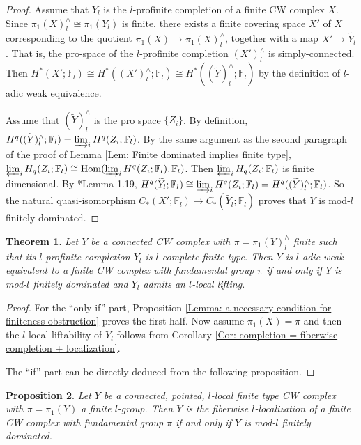 \documentclass[11pt]{amsart}
\newtheorem{theorem}{Theorem}[section]
\newtheorem{proposition}[theorem]{Proposition}
\theoremstyle{definition}
\numberwithin{equation}{section}
\numberwithin{equation}{section}
\newcommand\FF{\mathbb{F}}
\DeclareMathOperator{\homo}{Hom}
\begin{document}
\begin{proof}
Assume that $Y_l$ is the $l$-profinite completion of a finite CW complex $X$. Since $\pi_1(X)^{\wedge}_l\cong \pi_1(Y_l)$ is finite, there exists a finite covering space $X'$ of $X$ corresponding to the quotient $\pi_1(X)\rightarrow \pi_1(X)^{\wedge}_l$, together with a map $X'\rightarrow \widetilde{Y_l}$. That is, the pro-space of the $l$-profinite completion $(X')^{\wedge}_l$ is simply-connected. Then $H^*(X';\FF_l)\cong H^*((X')^{\wedge}_l;\FF_l)\cong H^*((\widetilde{Y})^{\wedge}_l;\FF_l)$ by the definition of $l$-adic weak equivalence. 

Assume that $(\widetilde{Y})^{\wedge}_l$ is the pro space $\{Z_i\}$. By definition, $H^q((\widetilde{Y})^{\wedge}_l;\FF_l)=\varinjlim_i H^q(Z_i;\FF_l)$. By the same argument as the second paragraph of the proof of Lemma \ref{Lem: Finite dominated implies finite type}, $\varprojlim_i H_q(Z_i;\FF_l)\cong \homo(\varinjlim_i H^q(Z_i;\FF_l),\FF_l)$. Then $\varprojlim_i H_q(Z_i;\FF_l)$ is finite dimensional. By \cite{Hu-Zhang-formal-manifold}*{Lemma 1.19}, $H^q(\widetilde{Y}_l;\FF_l)\cong \varinjlim_i H^q(Z_i;\FF_l)=H^q((\widetilde{Y})^{\wedge}_l;\FF_l)$.
 So the natural quasi-isomorphism $C_*(X';\FF_l)\rightarrow C_*(\widetilde{Y_l};\FF_l)$ proves that $Y$ is mod-$l$ finitely dominated.    
\end{proof}

\begin{theorem}\label{Thm: Main Theorem 1}
Let $Y$ be a connected CW complex with $\pi=\pi_1(Y)^{\wedge}_l$ finite such that its $l$-profinite completion $Y_l$ is $l$-complete finite type. Then $Y$ is $l$-adic weak equivalent to a finite CW complex with fundamental group $\pi$ if and only if $Y$ is mod-$l$ finitely dominated and $Y_l$ admits an $l$-local lifting.
\end{theorem}

\begin{proof}
For the ``only if'' part, Proposition \ref{Lemma: a necessary condition for finiteness obstruction} proves the first half. Now assume $\pi_1(X)=\pi$ and then the $l$-local liftability of $Y_l$ follows from Corollary \ref{Cor: completion = fiberwise completion + localization}. 

The ``if'' part can be directly deduced from the following proposition.  
\end{proof}

\begin{proposition}\label{prop: finiteness obstruction for the local case}
Let $Y$ be a connected, pointed, $l$-local finite type CW complex with $\pi=\pi_1(Y)$ a finite $l$-group. Then $Y$ is the fiberwise $l$-localization of a finite CW complex with fundamental group $\pi$ if and only if $Y$ is mod-$l$ finitely dominated.
\end{proposition}
\end{document}
